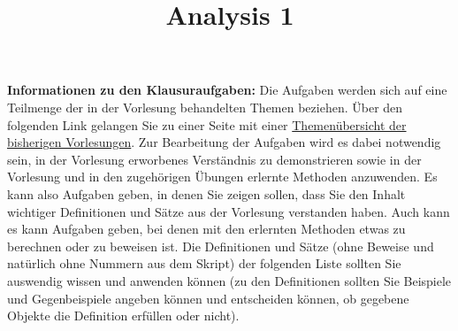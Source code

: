 \documentclass[10pt,a4paper,twoside]{article}
\title{Analysis 1}
\begin{document}
\pagestyle{fancy}
\setcounter{page}{1}

\maketitle

\textbf{Informationen zu den Klausuraufgaben:} Die Aufgaben werden sich auf eine Teilmenge der in der Vorlesung behandelten Themen beziehen. Über den folgenden Link gelangen Sie zu einer Seite mit einer 
\href{http://www.math.lmu.de/~philip/teaching/2017_calc1_forInfAndStatStudents/summary.html}{Themenübersicht der bisherigen Vorlesungen}. 
Zur Bearbeitung der Aufgaben wird es dabei notwendig sein, in der Vorlesung erworbenes Verständnis zu demonstrieren sowie in der Vorlesung und in den zugehörigen Übungen erlernte Methoden anzuwenden. Es kann also Aufgaben geben, in denen Sie zeigen sollen, dass Sie den Inhalt wichtiger Definitionen und Sätze aus der Vorlesung verstanden haben. Auch kann es kann Aufgaben geben, bei denen mit den erlernten Methoden etwas zu berechnen oder zu beweisen ist. Die Definitionen und Sätze (ohne Beweise und natürlich ohne Nummern aus dem Skript) der folgenden Liste sollten Sie auswendig wissen und anwenden können (zu den Definitionen sollten Sie Beispiele und Gegenbeispiele angeben können und entscheiden können, ob gegebene Objekte die Definition erfüllen oder nicht). 

\tableofcontents
\cleardoublepage

\setcounter{page}{1}
\fancyhead[LO,RE]{\leftmark}
\fancyfoot[LE,RO]{\thepage}












\end{document}
